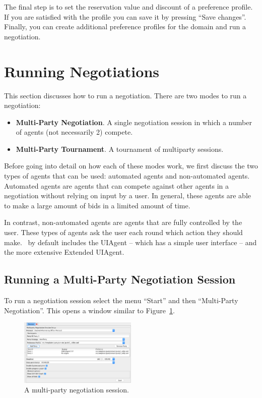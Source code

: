 \documentclass[]{article}
\begin{document}
The final step is to set the reservation value and discount of a preference profile. If you are satisfied with the profile you can save it by pressing ``Save changes''. Finally, you can create additional preference profiles for the domain and run a negotiation.


\section{Running Negotiations}
This section discusses how to run a negotiation. There are two modes to run a negotiation:

\begin{itemize}
	\item \textbf{Multi-Party Negotiation}. A single negotiation session in which a number of agents (not necessarily 2) compete.
	\item \textbf{Multi-Party Tournament}. A tournament of multiparty sessions.
	
\end{itemize}

Before going into detail on how each of these modes work, we first discuss the two types of agents that can be used: automated agents and non-automated agents. Automated agents are agents that can compete against other agents in a negotiation without relying on input by a user. In general, these agents are able to make a large amount of bids in a limited amount of time.

In contrast, non-automated agents are agents that are fully controlled by the user. These types of agents ask the user each round which action they should make. \Genius~by default includes the UIAgent -- which has a simple user interface -- and the more extensive Extended UIAgent.


\subsection{Running a Multi-Party Negotiation Session}\label{sec:singlesessionrun}
To run a negotiation session select the menu ``Start'' and then ``Multi-Party Negotiation''. This opens a window similar to Figure~\ref{Fig:multipartysession}. 

\begin{figure}[h!]
	\centering
	\includegraphics[width=0.5\textwidth]{media/multipartysession.png}
\caption{A multi-party negotiation session.}\label{Fig:multipartysession}
\end{figure}
\end{document}
